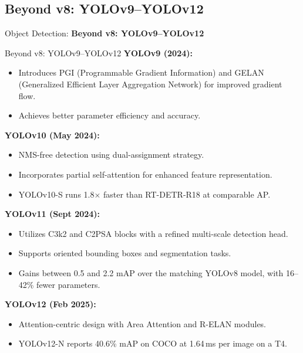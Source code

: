 \subsection{Beyond v8: YOLOv9--YOLOv12}
\begin{frame}{}
    \LARGE Object Detection: \textbf{Beyond v8: YOLOv9--YOLOv12}
\end{frame}

\begin{frame}[allowframebreaks]{Beyond v8: YOLOv9--YOLOv12}
    \textbf{YOLOv9 (2024):}
    \begin{itemize}
        \item Introduces PGI (Programmable Gradient Information) and GELAN (Generalized Efficient Layer Aggregation Network) for improved gradient flow.
        \item Achieves better parameter efficiency and accuracy.
    \end{itemize}

    \textbf{YOLOv10 (May 2024):}
    \begin{itemize}
        \item NMS-free detection using dual-assignment strategy.
        \item Incorporates partial self-attention for enhanced feature representation.
        \item YOLOv10-S runs 1.8$\times$ faster than RT-DETR-R18 at comparable AP.
    \end{itemize}

\framebreak

    \textbf{YOLOv11 (Sept 2024):}
    \begin{itemize}
        \item Utilizes C3k2 and C2PSA blocks with a refined multi-scale detection head.
        \item Supports oriented bounding boxes and segmentation tasks.
        \item Gains between 0.5 and 2.2 mAP over the matching YOLOv8 model, with 16--42\% fewer parameters.
    \end{itemize}

    \textbf{YOLOv12 (Feb 2025):}
    \begin{itemize}
        \item Attention-centric design with Area Attention and R-ELAN modules.
        \item YOLOv12-N reports 40.6\% mAP on COCO at 1.64\,ms per image on a T4.
    \end{itemize}
\end{frame}